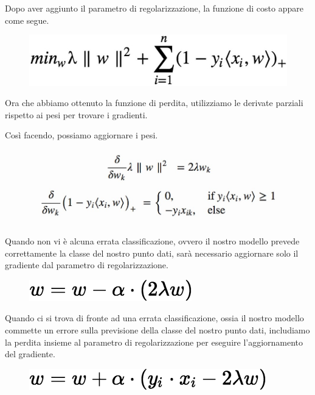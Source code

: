 Dopo aver aggiunto il parametro di regolarizzazione, la funzione di costo appare come segue.
\begin{figure}
    \begin{center}    
        \includegraphics[width=0.9\linewidth]{images/image31.jpeg}
    \end{center}
\end{figure}
Ora che abbiamo ottenuto la funzione di perdita, utilizziamo le derivate parziali rispetto ai pesi per trovare i gradienti. 

Così facendo, possiamo aggiornare i pesi.
\begin{figure}
    \begin{center}    
        \includegraphics[width=0.9\linewidth]{images/image32.jpeg}
    \end{center}
\end{figure}
Quando non vi è alcuna errata classificazione, ovvero il nostro modello prevede correttamente la classe del nostro punto dati, sarà necessario aggiornare solo il gradiente dal parametro di regolarizzazione.
\begin{figure}
    \begin{center}    
        \includegraphics[width=0.9\linewidth]{images/image33.png}
    \end{center}
\end{figure}
Quando ci si trova di fronte ad una errata classificazione, ossia il nostro modello commette un errore sulla previsione della classe del nostro punto dati, includiamo la perdita insieme al parametro di regolarizzazione per eseguire l'aggiornamento del gradiente.


\begin{figure}
    \begin{center}    
        \includegraphics[width=0.9\linewidth]{images/image34.png}
    \end{center}
\end{figure}

